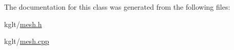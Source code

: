 The documentation for this class was generated from the following files\-:\begin{DoxyCompactItemize}
\item 
kglt/\hyperlink{mesh_8h}{mesh.\-h}\item 
kglt/\hyperlink{mesh_8cpp}{mesh.\-cpp}\end{DoxyCompactItemize}
